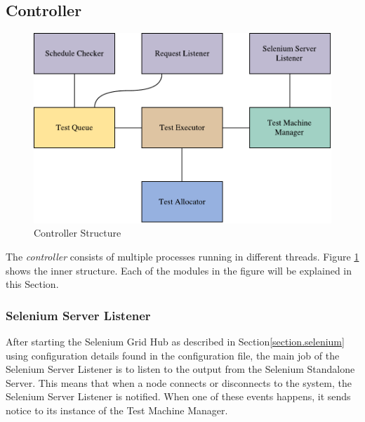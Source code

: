 




\subsection{Controller}

\begin{figure}[h]
    \centering
    \includegraphics[width=\textwidth]{figures/new/controller3.pdf}
    \caption{Controller Structure}
    \label{fig.controller_structure}
\end{figure}


\noindent The \emph{controller} consists of multiple processes running in different threads. Figure \ref{fig.controller_structure} shows the inner structure. Each of the modules in the figure will be explained in this Section.

\subsubsection{Selenium Server Listener}
After starting the Selenium Grid Hub as described in Section\ref{section.selenium} using configuration details found in the configuration file, the main job of the Selenium Server Listener is to listen to the output from the Selenium Standalone Server. This means that when a node connects or disconnects to the system, the Selenium Server Listener is notified. When one of these events happens, it sends notice to its instance of the Test Machine Manager.

